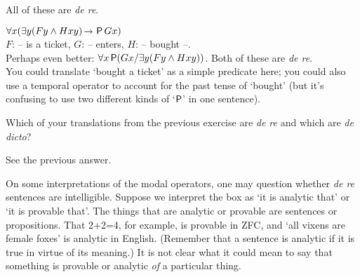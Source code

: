 \begin{solution}
\begin{sollist}
    All of these are \emph{de re}. \\[-2mm]
    
  \item %

    $\forall x (\exists y (Fy \land Hxy) \to \Pe Gx)$\\
    $F$: -- is a ticket, $G$: -- enters, $H$: -- bought --.\\[1mm]
    Perhaps even better: $\forall x \operatorname{\mathsf{P}}(Gx/ \exists y (Fy \land Hxy))$.
    Both of these are \emph{de re}.\\[1mm]
    You could translate `bought a ticket' as a simple predicate here;
    you could also use a temporal operator to account for the past
    tense of `bought' (but it's confusing to use two different kinds
    of `$\operatorname{\mathsf{P}}$' in one sentence).
    \\[-2mm]

  \end{sollist}
\end{solution}

\begin{exercise}
  Which of your translations from the previous exercise are \emph{de
    re} and which are \emph{de dicto}?
\end{exercise}
\begin{solution}
  See the previous answer.
\end{solution}

On some interpretations of the modal operators, one may question whether
\emph{de re} sentences are intelligible. Suppose we interpret the box as `it is
analytic that' or `it is provable that'. The things that are analytic or
provable are sentences or propositions. That 2+2=4, for example, is provable in
ZFC, and `all vixens are female foxes' is analytic in English. (Remember that a
sentence is analytic if it is true in virtue of its meaning.) It is not clear
what it could mean to say that something is provable or analytic \emph{of} a
particular thing.

